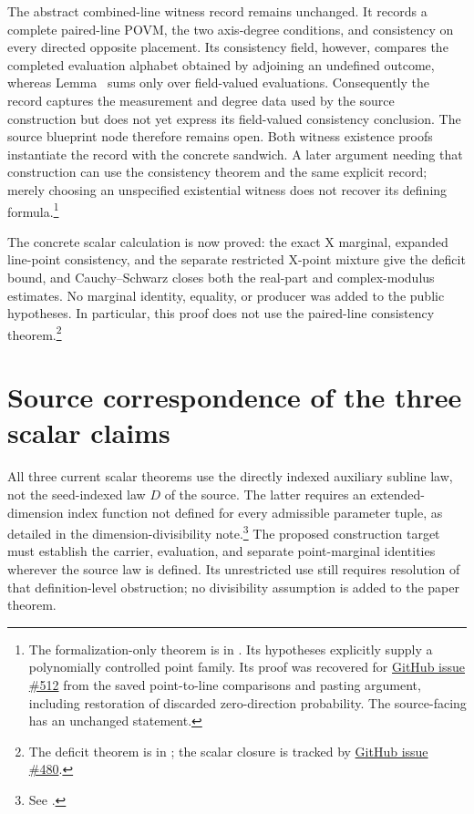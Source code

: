 \documentclass[11pt]{article}
\renewcommand{\ghissue}[1]{%
  \href{https://github.com/Dengnifer/MIPStarRE-A/issues/#1}{GitHub issue \##1}}
\begin{document}
The abstract combined-line witness record remains unchanged. It records a
complete paired-line POVM, the two axis-degree conditions, and consistency on
every directed opposite placement. Its consistency field, however, compares
the completed evaluation alphabet obtained by adjoining an undefined outcome,
whereas Lemma~ sums only over field-valued evaluations.
Consequently the record captures the measurement and degree data used by the
source construction but does not yet express its field-valued consistency
conclusion. The source blueprint node therefore remains open. Both witness
existence proofs instantiate the record with the concrete sandwich. A later
argument needing that construction can use the consistency theorem and the
same explicit record; merely choosing an unspecified existential witness does
not recover its defining formula.\footnote{The formalization-only theorem is
 in
. Its hypotheses explicitly supply
a polynomially controlled point family. Its proof was recovered for
\ghissue{512} from the saved point-to-line comparisons and pasting argument,
including restoration of discarded zero-direction probability. The source-facing
 has an unchanged statement.}

The concrete scalar calculation is now proved: the exact X marginal,
expanded line-point consistency, and the separate restricted X-point mixture
give the deficit bound, and Cauchy--Schwarz closes both the real-part and
complex-modulus estimates.
No marginal identity, equality, or producer was added to the public
hypotheses. In particular, this proof does not use the
paired-line consistency theorem.\footnote{The deficit theorem is
 in
; the scalar
closure is tracked by \ghissue{480}.}

\section{Source correspondence of the three scalar claims}

All three current scalar theorems use the directly indexed auxiliary
subline law, not the seed-indexed law $D$ of the source. The latter requires
an extended-dimension index function not defined for every admissible
parameter tuple, as detailed in the dimension-divisibility note.\footnote{See
.}
The proposed construction target
 must establish the
carrier, evaluation, and separate point-marginal identities wherever the
source law is defined. Its unrestricted use still requires resolution of
that definition-level obstruction; no divisibility assumption is added to
the paper theorem.
\end{document}
